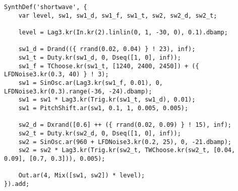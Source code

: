 \begin{lstlisting}
SynthDef('shortwave', {
	var level, sw1, sw1_d, sw1_f, sw1_t, sw2, sw2_d, sw2_t;

	level = Lag3.kr(In.kr(2).linlin(0, 1, -30, 0), 0.1).dbamp;

	sw1_d = Drand(({ rrand(0.02, 0.04) } ! 23), inf);
	sw1_t = Duty.kr(sw1_d, 0, Dseq([1, 0], inf));
	sw1_f = TChoose.kr(sw1_t, [1240, 2400, 2450]) + ({ LFDNoise3.kr(0.3, 40) } ! 3);
	sw1 = SinOsc.ar(Lag3.kr(sw1_f, 0.01), 0, LFDNoise3.kr(0.3).range(-36, -24).dbamp);
	sw1 = sw1 * Lag3.kr(Trig.kr(sw1_t, sw1_d), 0.01);
	sw1 = PitchShift.ar(sw1, 0.1, 1, 0.005, 0.005);

	sw2_d = Dxrand([0.6] ++ ({ rrand(0.02, 0.09) } ! 15), inf);
	sw2_t = Duty.kr(sw2_d, 0, Dseq([1, 0], inf));
	sw2 = SinOsc.ar(960 + LFDNoise3.kr(0.2, 25), 0, -21.dbamp);
	sw2 = sw2 * Lag3.kr(Trig.kr(sw2_t, TWChoose.kr(sw2_t, [0.04, 0.09], [0.7, 0.3])), 0.005);

	Out.ar(4, Mix([sw1, sw2]) * level);
}).add;
\end{lstlisting}
